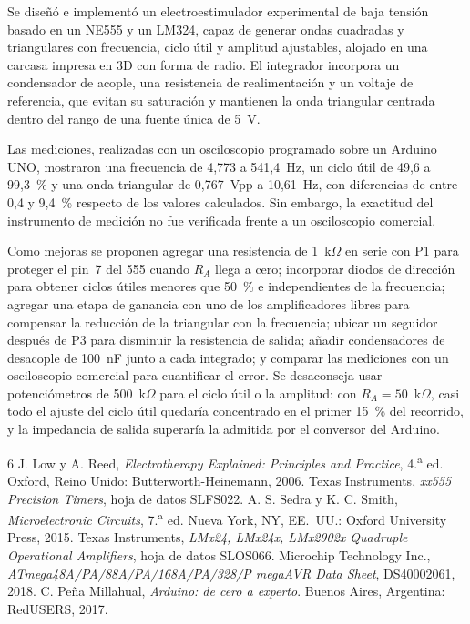 \documentclass[conference]{IEEEtran}
\begin{document}
Se diseñó e implementó un electroestimulador experimental de baja tensión basado en un NE555 y un LM324, capaz de generar ondas cuadradas y triangulares con frecuencia, ciclo útil y amplitud ajustables, alojado en una carcasa impresa en 3D con forma de radio. El integrador incorpora un condensador de acople, una resistencia de realimentación y un voltaje de referencia, que evitan su saturación y mantienen la onda triangular centrada dentro del rango de una fuente única de 5~V.

Las mediciones, realizadas con un osciloscopio programado sobre un Arduino UNO, mostraron una frecuencia de 4,773 a 541,4~Hz, un ciclo útil de 49,6 a 99,3~\% y una onda triangular de 0,767~Vpp a 10,61~Hz, con diferencias de entre 0,4 y 9,4~\% respecto de los valores calculados. Sin embargo, la exactitud del instrumento de medición no fue verificada frente a un osciloscopio comercial.

Como mejoras se proponen agregar una resistencia de 1~k$\Omega$ en serie con P1 para proteger el pin~7 del 555 cuando $R_A$ llega a cero; incorporar diodos de dirección para obtener ciclos útiles menores que 50~\% e independientes de la frecuencia; agregar una etapa de ganancia con uno de los amplificadores libres para compensar la reducción de la triangular con la frecuencia; ubicar un seguidor después de P3 para disminuir la resistencia de salida; añadir condensadores de desacople de 100~nF junto a cada integrado; y comparar las mediciones con un osciloscopio comercial para cuantificar el error. Se desaconseja usar potenciómetros de 500~k$\Omega$ para el ciclo útil o la amplitud: con $R_A = 50$~k$\Omega$, casi todo el ajuste del ciclo útil quedaría concentrado en el primer 15~\% del recorrido, y la impedancia de salida superaría la admitida por el conversor del Arduino.

\begin{thebibliography}{6}
 J. Low y A. Reed, \textit{Electrotherapy Explained: Principles and Practice}, 4.\textsuperscript{a} ed. Oxford, Reino Unido: Butterworth-Heinemann, 2006.
 Texas Instruments, \textit{xx555 Precision Timers}, hoja de datos SLFS022.
 A. S. Sedra y K. C. Smith, \textit{Microelectronic Circuits}, 7.\textsuperscript{a} ed. Nueva York, NY, EE.~UU.: Oxford University Press, 2015.
 Texas Instruments, \textit{LMx24, LMx24x, LMx2902x Quadruple Operational Amplifiers}, hoja de datos SLOS066.
 Microchip Technology Inc., \textit{ATmega48A/PA/88A/PA/168A/PA/328/P megaAVR Data Sheet}, DS40002061, 2018.
 C. Peña Millahual, \textit{Arduino: de cero a experto}. Buenos Aires, Argentina: RedUSERS, 2017.
\end{thebibliography}
\end{document}
